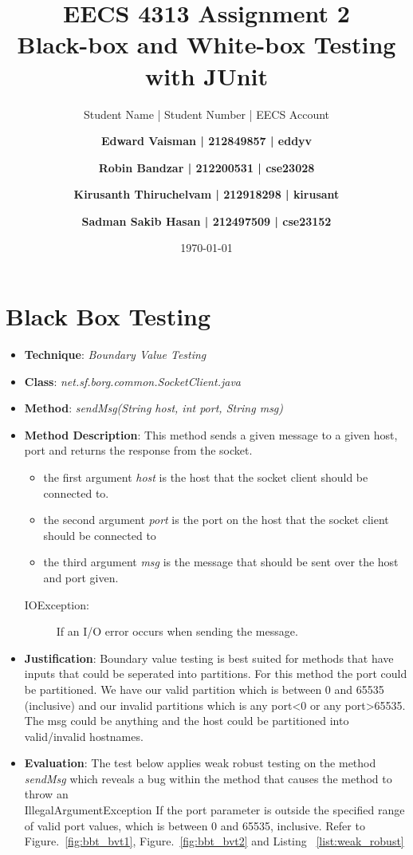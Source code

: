 \documentclass[fontsize=12pt,paper=letter,twoside]{scrartcl}
\author{Student Name | Student Number | EECS Account
\and \textbf{Edward Vaisman | 212849857 | eddyv}
\and \textbf{Robin Bandzar | 212200531 | cse23028}
\and \textbf{Kirusanth Thiruchelvam | 212918298 | kirusant}
\and \textbf{Sadman Sakib Hasan | 212497509 | cse23152}
}
\date{\today} %
\begin{document}
\title{EECS 4313 Assignment 2 \\Black-box and White-box Testing with JUnit}
\maketitle

\newpage

\tableofcontents


\newpage



\section{Black Box Testing}
\begin{itemize}
\item \textbf{Technique}: \emph{Boundary Value Testing}
\item \textbf{Class}: \emph{net.sf.borg.common.SocketClient.java}
\item \textbf{Method}: \emph{sendMsg(String host, int port, String msg)}
\item \textbf{Method Description}:
This method sends a given message to a given host, port and returns the response from the socket.
\begin{itemize}
\item the first argument \emph{host} is the host that the socket client should be connected to.
\item the second argument \emph{port} is the port on the host that the socket client should be connected to
\item the third argument \emph{msg} is the message that should be sent over the host and port given.
\end{itemize}
\begin{description}
\item[IOException:] If an I/O error occurs when sending the message.
\end{description}
\item \textbf{Justification}: Boundary value testing is best suited for methods that have inputs that could be seperated into partitions. For this method the port could be partitioned. We have our valid partition which is between 0 and 65535 (inclusive) and our invalid partitions which is any port\textless 0 or any port\textgreater 65535. The msg could be anything and the host could be partitioned into valid/invalid hostnames.
\item \textbf{Evaluation}: The test below applies weak robust testing on the method \emph{sendMsg} which reveals a bug within the method that causes the method to throw an \\ \mbox{IllegalArgumentException} If the port parameter is outside the specified range of valid port values, which is between 0 and 65535, inclusive. Refer to Figure.~\ref{fig:bbt_bvt1}, Figure.~\ref{fig:bbt_bvt2} and Listing ~\ref{list:weak_robust}\\ \\

\end{itemize}
\end{document}
